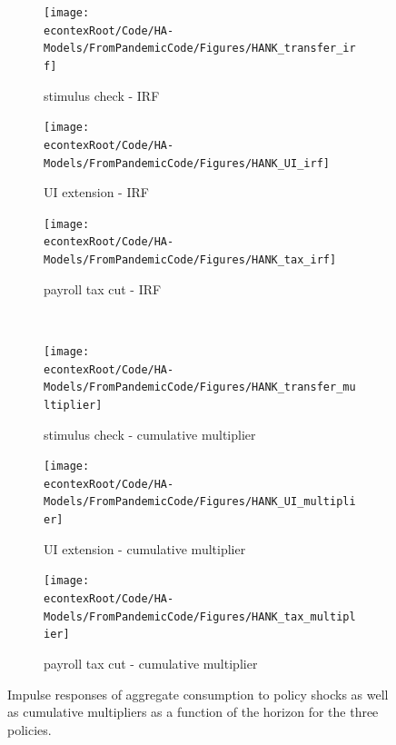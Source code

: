 \documentclass[\econtexRoot/HAFiscal]{subfiles}
\begin{document}
\begin{figure}[htb]
	\centering
	\begin{subfigure}[b]{.33\linewidth}
		\centering
		\texttt{[image: \\econtexRoot/Code/HA-Models/FromPandemicCode/Figures/HANK\_transfer\_irf]}
		\caption{stimulus check - IRF}
		\notinsubfile{\label{fig:hank_stimulus_irf}}
	\end{subfigure}%
	\begin{subfigure}[b]{.33\linewidth}
		\centering
		\texttt{[image: \\econtexRoot/Code/HA-Models/FromPandemicCode/Figures/HANK\_UI\_irf]}
		\caption{UI extension - IRF}
		\notinsubfile{\label{fig:hank_UI_irf}}
	\end{subfigure}%
	\begin{subfigure}[b]{.33\linewidth}
		\centering
		\texttt{[image: \\econtexRoot/Code/HA-Models/FromPandemicCode/Figures/HANK\_tax\_irf]}
		\caption{payroll tax cut - IRF}
		\notinsubfile{\label{fig:hank_tax_irf}}
	\end{subfigure}\\
	\begin{subfigure}[b]{.33\linewidth}
		\centering
		\texttt{[image: \\econtexRoot/Code/HA-Models/FromPandemicCode/Figures/HANK\_transfer\_multiplier]}
		\caption{stimulus check - cumulative multiplier}
		\notinsubfile{\label{fig:HANK_transfer_multiplier}}
	\end{subfigure}%
	\begin{subfigure}[b]{.33\linewidth}
		\centering
		\texttt{[image: \\econtexRoot/Code/HA-Models/FromPandemicCode/Figures/HANK\_UI\_multiplier]}
		\caption{UI extension - cumulative multiplier}
		\notinsubfile{\label{fig:HANK_UI_multiplier}}
	\end{subfigure}%
	\begin{subfigure}[b]{.33\linewidth}
		\centering
		\texttt{[image: \\econtexRoot/Code/HA-Models/FromPandemicCode/Figures/HANK\_tax\_multiplier]}
		\caption{payroll tax cut - cumulative multiplier}
		\notinsubfile{\label{fig:HANK_tax_multiplier}}
	\end{subfigure}
	\caption{Impulse responses of aggregate consumption to policy shocks as well as cumulative multipliers as a function of the horizon for the three policies.
{\label{fig:HANK_IRFs}}}
\end{figure}
\end{document}
